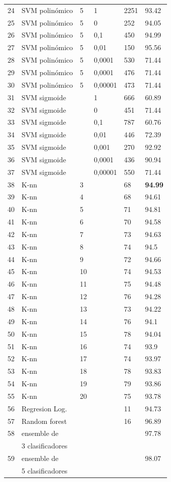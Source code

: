 \documentclass[journal]{IEEEtran}
\begin{document}
\begin{table}[!hb]
\begin{tabular}{l | l l l | l l}
	24	&	SVM polinómico 	&	5	&	1	&	2251	&	93.42 \\
	25	&	SVM polinómico 	&	5	&	0	&	252	&	94.05 \\
	26	&	SVM polinómico 	&	5	&	 0,1  	&	450	&	94.99 \\
	27	&	SVM polinómico 	&	5	&	 0,01  	&	150	&	95.56 \\
	28	&	SVM polinómico 	&	5	&	0,0001	&	530	&	71.44 \\
	29	&	SVM polinómico 	&	5	&	 0,0001  	&	476	&	71.44 \\
	30	&	SVM polinómico 	&	5	&	 0,00001  	&	473	&	71.44 \\
	31	&	SVM sigmoide 	&		&	1	&	666	&	60.89 \\
	32	&	SVM sigmoide 	&		&	0	&	451	&	71.44 \\
	33	&	SVM sigmoide 	&		&	 0,1 	&	787	&	60.76 \\
	34	&	SVM sigmoide 	&		&	 0,01 	&	446	&	72.39 \\
	35	&	SVM sigmoide 	&		&	0,001	&	270	&	92.92 \\
	36	&	SVM sigmoide 	&		&	 0,0001 	&	436	&	90.94 \\
	37	&	SVM sigmoide 	&		&	 0,00001 	&	550	&	71.44 \\
\hline
	38	&	K-nn	&	3	&		&	68	&	\textbf{94.99} \\
	39	&	K-nn	&	4	&		&	68	&	94.61 \\
	40	&	K-nn	&	5	&		&	71	&	94.81 \\
	41	&	K-nn	&	6	&		&	70	&	94.58 \\
	42	&	K-nn	&	7	&		&	73	&	94.63 \\
	43	&	K-nn	&	8	&		&	74	&	94.5 \\
	44	&	K-nn	&	9	&		&	72	&	94.66 \\
	45	&	K-nn	&	10	&		&	74	&	94.53 \\
	46	&	K-nn	&	11	&		&	75	&	94.48 \\
	47	&	K-nn	&	12	&		&	76	&	94.28 \\
	48	&	K-nn	&	13	&		&	73	&	94.22 \\
	49	&	K-nn	&	14	&		&	76	&	94.1 \\
	50	&	K-nn	&	15	&		&	78	&	94.04 \\
	51	&	K-nn	&	16	&		&	74	&	93.9 \\
	52	&	K-nn	&	17	&		&	74	&	93.97 \\
	53	&	K-nn	&	18	&		&	78	&	93.83 \\
	54	&	K-nn	&	19	&		&	79	&	93.86 \\
	55	&	K-nn	&	20	&		&	75	&	93.78 \\
\hline
	56	& Regresion Log. &		&		&	11      &       94.73 \\
\hline
	57	& Random forest	&		&		&	16	&	96.89 \\
\hline
	58	&  ensemble de &	  	&		&		&	97.78 \\
		&  3 clasificadores &		&		&		&	      \\
\hline
	59	&  ensemble de &	  	&		&		&	98.07 \\
		&  5 clasificadores &		&		&		&	      \\

\end{tabular}
\end{table}
\end{document}
